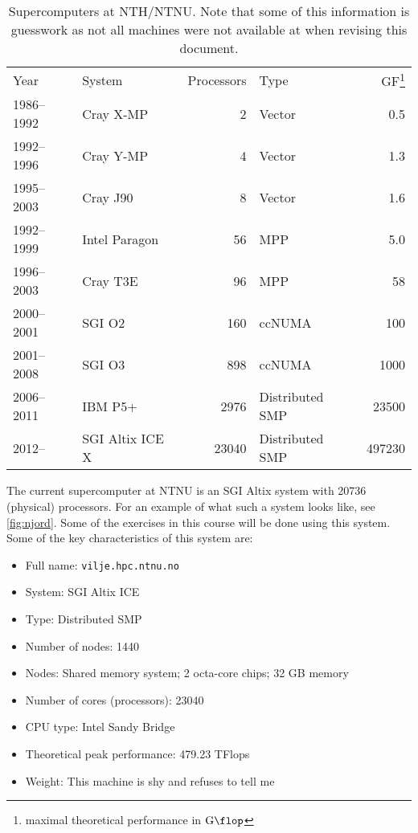 \begin{table}
  \caption{
    Supercomputers at NTH/NTNU. Note that some of this information is guesswork
    as not all machines were not available at when revising this document.
  }
  \centering
  \bgroup{}
  \begin{tabular}{llrlr}
    \hline
    Year & System & Processors & Type & GF\footnote{maximal theoretical performance in $\SI{}{\giga\flop}$} \\
    \hhline{=====}
    1986--1992 & Cray X-MP & 2 & Vector & 0.5 \\
    1992--1996 & Cray Y-MP & 4 & Vector & 1.3\\
    1995--2003 & Cray J90     & 8 & Vector & 1.6 \\
    1992--1999 & Intel Paragon & 56 & MPP & 5.0\\
    1996--2003 & Cray T3E & 96 & MPP & 58\\
    2000--2001 & SGI O2 & 160 & ccNUMA & 100\\
    2001--2008 & SGI O3 & 898 & ccNUMA & 1000\\
    2006--2011 & IBM P5+ & 2976 & Distributed SMP & 23500\\
    2012--     & SGI Altix ICE X & 23040 & Distributed SMP & 497230 \\
    \hline
  \end{tabular}
  \egroup
  \label{tab:history-ntnu}
\end{table}

The current supercomputer at NTNU is an SGI Altix system with 20736 (physical)
processors. For an example of what such a system looks like, see
\autoref{fig:njord}. Some of the exercises in this course will be done using
this system. Some of the key characteristics of this system are:
\begin{itemize}
\item Full name: \texttt{vilje.hpc.ntnu.no}
\item System: SGI Altix ICE
\item Type: Distributed SMP
\item Number of nodes: 1440
\item Nodes: Shared memory system; 2 octa-core chips; 32 GB memory
\item Number of cores (processors): 23040
\item CPU type: Intel Sandy Bridge
\item Theoretical peak performance: 479.23 TFlops
\item Weight: This machine is shy and refuses to tell me
\end{itemize}

